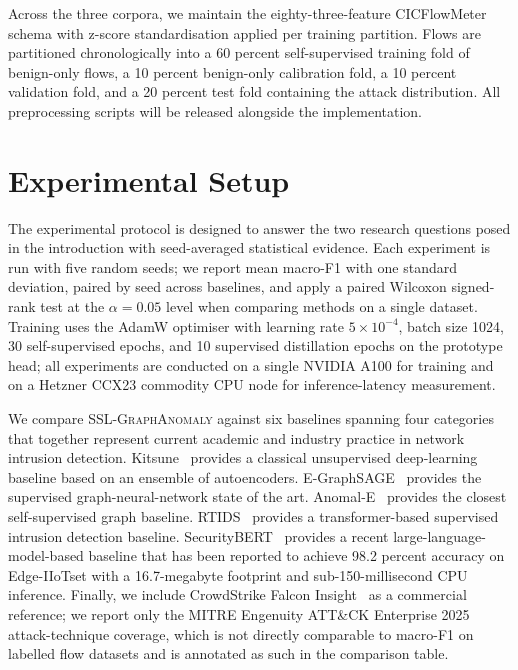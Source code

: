 \documentclass{ieeeaccess}
\begin{document}
Across the three corpora, we maintain the eighty-three-feature CICFlowMeter
schema with z-score standardisation applied per training partition. Flows
are partitioned chronologically into a 60 percent self-supervised training
fold of benign-only flows, a 10 percent benign-only calibration fold, a
10 percent validation fold, and a 20 percent test fold containing the
attack distribution. All preprocessing scripts will be released alongside
the implementation.

\section{Experimental Setup}
\label{sec:experiments}
The experimental protocol is designed to answer the two research questions
posed in the introduction with seed-averaged statistical evidence. Each
experiment is run with five random seeds; we report mean macro-F1 with one
standard deviation, paired by seed across baselines, and apply a paired
Wilcoxon signed-rank test at the $\alpha = 0.05$ level when comparing
methods on a single dataset. Training uses the AdamW optimiser with
learning rate $5 \times 10^{-4}$, batch size 1024, 30 self-supervised
epochs, and 10 supervised distillation epochs on the prototype head; all
experiments are conducted on a single NVIDIA A100 for training and on a
Hetzner CCX23 commodity CPU node for inference-latency measurement.

We compare \textsc{SSL-GraphAnomaly} against six baselines spanning four
categories that together represent current academic and industry practice
in network intrusion detection. Kitsune~\cite{mirsky2018kitsune} provides
a classical unsupervised deep-learning baseline based on an ensemble of
autoencoders. E-GraphSAGE~\cite{lo2022egraphsage} provides the supervised
graph-neural-network state of the art. Anomal-E~\cite{caville2022anomale}
provides the closest self-supervised graph baseline. RTIDS~\cite{wu2022rtids}
provides a transformer-based supervised intrusion detection baseline.
SecurityBERT~\cite{ferrag2024securitybert} provides a recent
large-language-model-based baseline that has been reported to achieve
98.2 percent accuracy on Edge-IIoTset with a 16.7-megabyte footprint and
sub-150-millisecond CPU inference. Finally, we include
CrowdStrike Falcon Insight~\cite{crowdstrike2025mitre} as a commercial
reference; we report only the MITRE Engenuity ATT\&CK Enterprise 2025
attack-technique coverage, which is not directly comparable to macro-F1 on
labelled flow datasets and is annotated as such in the comparison table.
\end{document}

